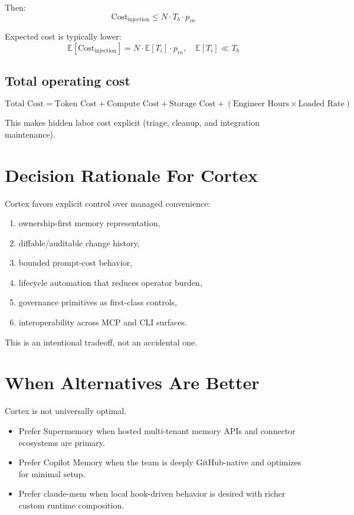 \documentclass[11pt]{article}
\begin{document}
Then:
\[
\text{Cost}_{\text{injection}} \le N \cdot T_b \cdot p_{in}
\]

Expected cost is typically lower:
\[
\mathbb{E}[\text{Cost}_{\text{injection}}] = N \cdot \mathbb{E}[T_i] \cdot p_{in}, \quad \mathbb{E}[T_i] \ll T_b
\]

\subsection{Total operating cost}
\[
\text{Total Cost} = \text{Token Cost} + \text{Compute Cost} + \text{Storage Cost} + (\text{Engineer Hours} \times \text{Loaded Rate})
\]

This makes hidden labor cost explicit (triage, cleanup, and integration maintenance).

\section{Decision Rationale For Cortex}
Cortex favors explicit control over managed convenience:
\begin{enumerate}
  \item ownership-first memory representation,
  \item diffable/auditable change history,
  \item bounded prompt-cost behavior,
  \item lifecycle automation that reduces operator burden,
  \item governance primitives as first-class controls,
  \item interoperability across MCP and CLI surfaces.
\end{enumerate}

This is an intentional tradeoff, not an accidental one.

\section{When Alternatives Are Better}
Cortex is not universally optimal.
\begin{itemize}
  \item Prefer Supermemory when hosted multi-tenant memory APIs and connector ecosystems are primary.
  \item Prefer Copilot Memory when the team is deeply GitHub-native and optimizes for minimal setup.
  \item Prefer claude-mem when local hook-driven behavior is desired with richer custom runtime composition.
\end{itemize}
\end{document}
